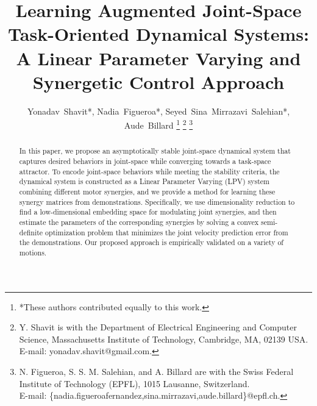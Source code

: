 \documentclass[letterpaper, 10 pt, conference,fleqn]{ieeeconf}
\begin{document}
%
\title{Learning Augmented Joint-Space Task-Oriented Dynamical Systems: \\ A
Linear Parameter Varying and Synergetic Control Approach}


%
%
\author{Yonadav~Shavit*, Nadia~Figueroa*, Seyed~Sina~Mirrazavi~Salehian*, Aude~Billard
\thanks{*These authors contributed equally to this work.}
\thanks{Y. Shavit is with the Department
of Electrical Engineering and Computer Science, Massachusetts Institute of Technology, Cambridge,
MA, 02139 USA. E-mail: yonadav.shavit@gmail.com.}%
\thanks{N. Figueroa, S. S. M. Salehian, and A. Billard are with the Swiss Federal Institute of Technology (EPFL), 1015 Lausanne, Switzerland. \\E-mail: \{nadia.figueroafernandez,sina.mirrazavi,aude.billard\}@epfl.ch.}
}%


\maketitle
\thispagestyle{empty}
\pagestyle{empty}



\begin{abstract}
In this paper, we propose an asymptotically stable joint-space dynamical system that captures desired behaviors in joint-space while converging towards a task-space attractor. %
 To encode joint-space behaviors while meeting the stability criteria, the dynamical system is constructed as a Linear Parameter Varying (LPV) system combining different motor synergies, and we provide a method for learning these synergy matrices from demonstrations. Specifically, we use dimensionality reduction to find a low-dimensional embedding space for modulating joint synergies, and then estimate the parameters of the corresponding synergies by solving a convex semi-definite optimization problem that minimizes the joint velocity prediction error from the demonstrations. Our proposed approach is empirically validated on a variety of motions. %
 \end{abstract}
\end{document}
